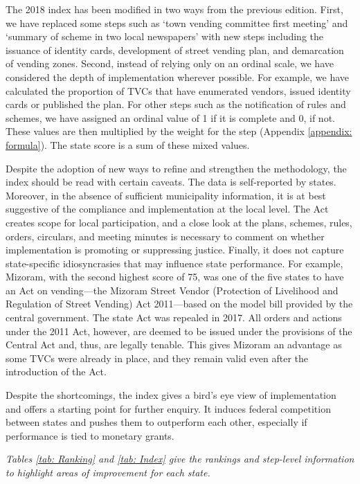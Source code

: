 \documentclass[a4paper, 12pt, twoside, table]{article}
\begin{document}
{	The 2018 index has been modified in two ways from the previous edition. First, we have replaced some steps such as `town vending committee first meeting' and `summary of scheme in two local newspapers' with new steps including the issuance of identity cards, development of street vending plan, and demarcation of vending zones. Second, instead of relying only on an ordinal scale, we have considered the depth of implementation wherever possible. For example, we have calculated the proportion of TVCs that have enumerated vendors, issued identity cards or published the plan. For other steps such as the notification of rules and schemes, we have assigned an ordinal value of 1 if it is complete and 0, if not. These values are then multiplied by the weight for the step (Appendix \ref{appendix: formula}). The state score is a sum of these mixed values.

	Despite the adoption of new ways to refine and strengthen the methodology, the index should be read with certain caveats. The data is self-reported by states. Moreover, in the absence of sufficient municipality information, it is at best suggestive of the compliance and implementation at the local level. The Act creates scope for local participation, and a close look at the plans, schemes, rules, orders, circulars, and meeting minutes is necessary to comment on whether implementation is promoting or suppressing justice. Finally, it does not capture state-specific idiosyncrasies that may influence state performance. For example, Mizoram, with the second highest score of 75, was one of the five states to have an Act on vending—the Mizoram Street Vendor (Protection of Livelihood and Regulation of Street Vending) Act 2011—based on the model bill provided by the central government. The state Act was repealed in 2017. All orders and actions under the 2011 Act, however, are deemed to be issued under the provisions of the Central Act and, thus, are legally tenable. This gives Mizoram an advantage as some TVCs were already in place, and they remain valid even after the introduction of the Act.

	Despite the shortcomings, the index gives a bird’s eye view of implementation and offers a starting point for further enquiry. It induces federal competition between states and pushes them to outperform each other, especially if performance is tied to monetary grants.

	\textit{Tables \ref{tab: Ranking} and \ref{tab: Index} give the rankings and step-level information to highlight areas of improvement for each state.}

}
\end{document}
